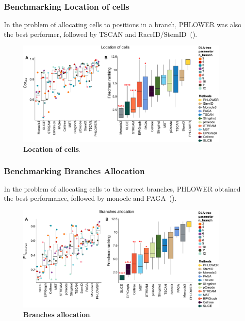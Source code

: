 \subsubsection{Benchmarking Location of cells}
In the problem of allocating cells to positions in a branch, PHLOWER was also the best performer, followed by TSCAN and RaceID/StemID~().
\begin{figure}[!h]
	\centering
	\includegraphics[width=0.95\textwidth]{Cordist/fig}
	\vspace{0.1cm}
	\caption[Location of cells]{
	\textbf{Location of cells}.}
	\label{fig:Cordist}
\end{figure}
\subsubsection{Benchmarking Branches Allocation}
In the problem of allocating cells to the correct branches, PHLOWER obtained the best performance, followed by monocle and PAGA~(). 


\begin{figure}[!ht]
	\centering
	\includegraphics[width=0.95\textwidth]{F1branches/fig}
	\vspace{0.1cm}
	\caption[Branches allocation]{
	\textbf{Branches allocation}.}
	\label{fig:f1branches}
\end{figure}


